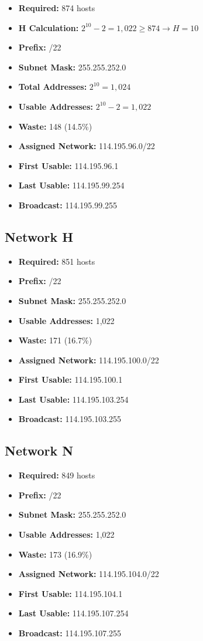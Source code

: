 \documentclass[12pt,a4paper]{report}
\begin{document}
\begin{itemize}
    \item \textbf{Required:} 874 hosts
    \item \textbf{H Calculation:} $2^{10} - 2 = 1,022 \geq 874 \rightarrow H = 10$
    \item \textbf{Prefix:} /22
    \item \textbf{Subnet Mask:} 255.255.252.0
    \item \textbf{Total Addresses:} $2^{10} = 1,024$
    \item \textbf{Usable Addresses:} $2^{10} - 2 = 1,022$
    \item \textbf{Waste:} 148 (14.5\%)
    \item \textbf{Assigned Network:} 114.195.96.0/22
    \item \textbf{First Usable:} 114.195.96.1
    \item \textbf{Last Usable:} 114.195.99.254
    \item \textbf{Broadcast:} 114.195.99.255
\end{itemize}

\subsection{Network H}

\begin{itemize}
    \item \textbf{Required:} 851 hosts
    \item \textbf{Prefix:} /22
    \item \textbf{Subnet Mask:} 255.255.252.0
    \item \textbf{Usable Addresses:} 1,022
    \item \textbf{Waste:} 171 (16.7\%)
    \item \textbf{Assigned Network:} 114.195.100.0/22
    \item \textbf{First Usable:} 114.195.100.1
    \item \textbf{Last Usable:} 114.195.103.254
    \item \textbf{Broadcast:} 114.195.103.255
\end{itemize}

\subsection{Network N}

\begin{itemize}
    \item \textbf{Required:} 849 hosts
    \item \textbf{Prefix:} /22
    \item \textbf{Subnet Mask:} 255.255.252.0
    \item \textbf{Usable Addresses:} 1,022
    \item \textbf{Waste:} 173 (16.9\%)
    \item \textbf{Assigned Network:} 114.195.104.0/22
    \item \textbf{First Usable:} 114.195.104.1
    \item \textbf{Last Usable:} 114.195.107.254
    \item \textbf{Broadcast:} 114.195.107.255
\end{itemize}
\end{document}
